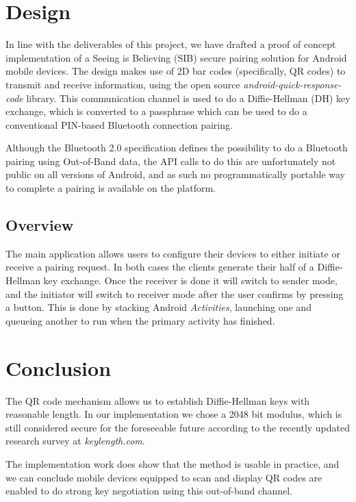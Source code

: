 \documentclass[conference, 11pt]{sty/IEEEtran}
\begin{document}
\section{Design}
\label{sec:design}
In line with the deliverables of this project, we have drafted a proof of concept implementation of a Seeing is Believing (SIB) secure pairing solution for Android mobile devices.
The design makes use of 2D bar codes (specifically, QR codes) to transmit and receive information, using the open source \textit{android-quick-response-code}\cite{aqrc} library.
This communication channel is used to do a Diffie-Hellman (DH) key exchange, which is converted to a passphrase which can be used to do a conventional PIN-based Bluetooth connection pairing.

Although the Bluetooth 2.0 specification defines the possibility to do a Bluetooth pairing using Out-of-Band data, the API calls to do this are unfortunately not public on all versions of Android, and as such no programmatically portable way to complete a pairing is available on the platform.

\subsection{Overview}
\label{ssec:overview}
The main application allows users to configure their devices to either initiate or receive a pairing request.
In both cases the clients generate their half of a Diffie-Hellman key exchange.
Once the receiver is done it will switch to sender mode, and the initiator will switch to receiver mode after the user confirms by pressing a button.
This is done by stacking Android \textit{Activities}, launching one and queueing another to run when the primary activity has finished.

\section{Conclusion}
\label{sec:conclusion}
The QR code mechanism allows us to establish Diffie-Hellman keys with reasonable length. In our implementation we chose a 2048 bit modulus, which is still considered secure for the foreseeable future according to the recently updated research survey at \textit{keylength.com}\cite{keylengthdotcom}.

The implementation work does show that the method is usable in practice, and we can conclude mobile devices equipped to scan and display QR codes are enabled to do strong key negotiation using this out-of-band channel.
\end{document}
